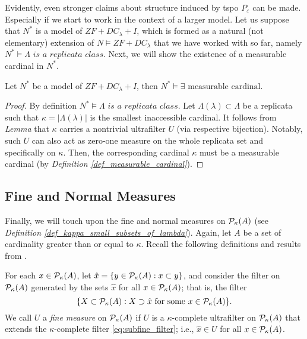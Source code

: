 Evidently, even stronger claims about structure induced by tspo $P_{\varepsilon}$ can be made. Especially if we start to work in the context of a larger model. Let us suppose that $N^\ast$ is a model of $ZF+DC_\lambda+I$, which is formed as a natural (not elementary) extension of $N \models ZF+DC_\lambda$ that we have worked with so far, namely $N^\ast \models \Lambda \textit{ is a replicata class}$. Next, we will show the existence of a measurable cardinal in $N^\ast$.

\begin{theorem}\label{theorem_nast_measurable_card}
    Let $N^\ast$ be a model of $ZF+DC_\lambda+I$, then $N^\ast \models \exists \text{ measurable cardinal}$.
\end{theorem}
\begin{proof}
    By definition $N^\ast \models \Lambda \textit{ is a replicata class}$. Let $\Lambda(\lambda) \subset \Lambda$ be a replicata such that $\kappa = |\Lambda(\lambda)|$ is the smallest inaccessible cardinal. It follows from \textit{Lemma } that $\kappa$ carries a nontrivial ultrafilter $U$ (via respective bijection). Notably, such $U$ can also act as zero-one measure on the whole replicata set and specifically on $\kappa$. Then, the corresponding cardinal $\kappa$ must be a measurable cardinal (by \textit{Definition \ref{def_measurable_cardinal}}).
\end{proof}

\subsection{Fine and Normal Measures}

Finally, we will touch upon the fine and normal measures on $\mathcal{P}_\kappa(A)$ (see \textit{Definition \ref{def_kappa_small_subsets_of_lambda}}). Again, let \( A \) be a set of cardinality greater than or equal to \( \kappa \). Recall the following definitions and results from \cite{jech2003set}.

\begin{definition}\label{def_fine_measure}
    For each \( x \in \mathcal{P}_{\kappa}(A) \), let $\hat{x} = \{ y \in \mathcal{P}_{\kappa}(A) : x \subset y \}$, and consider the filter on \( \mathcal{P}_{\kappa}(A) \) generated by the sets \( \hat{x} \) for all \( x \in \mathcal{P}_{\kappa}(A) \); that is, the filter
    \begin{equation} \label{eq:subfine_filter}
        \{ X \subset \mathcal{P}_{\kappa}(A) : X \supset \hat{x} \text{ for some } x \in \mathcal{P}_{\kappa}(A) \}.
    \end{equation}
    We call \( U \) a \emph{fine measure} on \( \mathcal{P}_{\kappa}(A) \) if \( U \) is a \( \kappa \)-complete ultrafilter on \( \mathcal{P}_{\kappa}(A) \) that extends the \( \kappa \)-complete filter \eqref{eq:subfine_filter}; i.e., \( \hat{x} \in U \) for all \( x \in \mathcal{P}_{\kappa}(A) \).
\end{definition}

